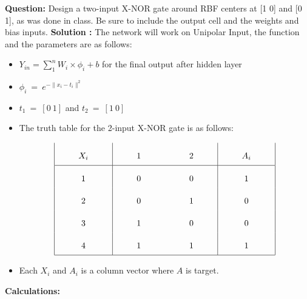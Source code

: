 \documentclass[12pt]{article}
\begin{document}
\textbf{Question: } Design a two-input X-NOR gate around RBF centers at [1 0] and [0 1], as was done in class. Be sure to include the output cell and the weights and bias inputs.
\BlankLine	
\textbf{Solution :} The network will work on Unipolar Input, the function and the parameters are as follows:
\BlankLine
\begin{itemize}
	\item $ Y_{in} = \displaystyle \sum_{1}^{n} W_i \times \phi_i + b$ for the final output after hidden layer
	\item $\phi_i \ = \ e^{-\parallel x_i - t_i \parallel ^ 2}$
	\item $t_1 \ = \ [0 \ 1]$ and $t_2 \ = \ [1\ 0]$
	
	\item The truth table for the 2-input X-NOR gate is as follows:

		\[\arraycolsep=1cm\def\arraystretch{2.2}
		\begin{array}{|c|c c|c|}
			X_i & 1 & 2 &  A_i\\
			\hline 
			1 & 0 & 0 & 1\\
			2 & 0 & 1 &  0\\ 
			3 & 1 & 0 & 0\\
			4 & 1 & 1 &  1\\
			\hline
		\end{array}\]
	
	\item Each $X_i$ and $A_i$  is a column vector where $A$ is target.

\end{itemize}
\BlankLine
\BlankLine
\textbf{Calculations: }
\end{document}
